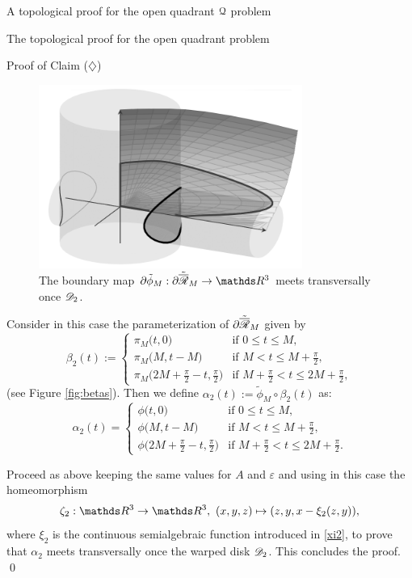 \documentclass[11pt, a4paper, english, twoside, notitlepage, openright]{report}
\begin{document}
\begin{chapter}{A topological proof for the open quadrant $\mathcal{Q}$ problem}
\begin{section}{The topological proof for the open quadrant problem}
\begin{subsection}{Proof of Claim ($\diamondsuit$)}
\begin{lemma}
\begin{Proof}
\begin{figure}[!ht]
\begin{center}
\includegraphics[height=6cm]{plots/ch3_01_A2.png}
\end{center}
\caption{The boundary map $\partial\tilde{\phi}_M:\partial\tilde{\overline{\Rr}}_M\rightarrow\R^3$ meets transversally once $\mathscr{D}_2$.}
\end{figure}

\vspace{1mm}

Consider in this case the parameterization of $\partial\tilde{\overline{\mathscr{R}}}_M$ given by
$$
\beta_2(t):=
\begin{cases}
\pi_M\big(t,0\big) &\text{if $0\le t\le M$},\\
\pi_M\big(M,t-M\big) &\text{if $M<t\le M+\frac{\pi}{2}$},\\
\pi_M\big(2M+\frac{\pi}{2}-t,\frac{\pi}{2}\big) &\text{if $M+\frac{\pi}{2}<t\le 2M+\frac{\pi}{2}$},
\end{cases}
$$ 
(see Figure \ref{fig:betas}). Then we define $\alpha_2(t):=\tilde{\phi}_M\circ\beta_2(t)$ as:
$$
\alpha_2(t) =
\begin{cases}
\phi\big(t,0\big) &\text{if $0\le t\le M$},\\
\phi\big(M,t-M\big) &\text{if $M<t\le M+\frac{\pi}{2}$},\\
\phi\big(2M+\frac{\pi}{2}-t,\frac{\pi}{2}\big) &\text{if $M+\frac{\pi}{2}<t\le 2M+\frac{\pi}{2}$}.
\end{cases}
$$ 

Proceed as above keeping the same values for $A$ and $\varepsilon$ and using in this case the homeomorphism
$$
\zeta_2:\R^3\to\R^3,\ (x,y,z)\mapsto(z,y,x-\xi_2(z,y)),
$$
where $\xi_2$ is the continuous semialgebraic function introduced in \eqref{xi2}, to prove that $\alpha_2$ meets transversally once the warped disk $\mathscr{D}_2$. This concludes the proof.
\qed
\end{Proof}
\end{lemma}


\end{subsection}
\end{section}
\end{chapter}
\end{document}
